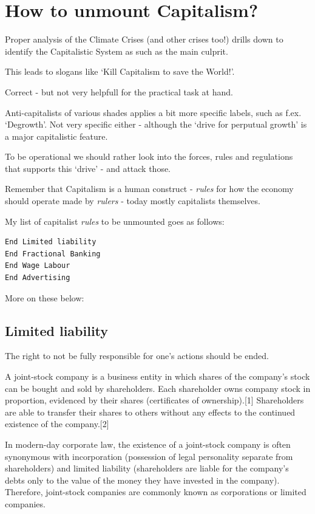 \documentclass[
]{book}
\begin{document}
\hypertarget{how-to-unmount-capitalism}{%
\chapter{How to unmount Capitalism?}\label{how-to-unmount-capitalism}}

Proper analysis of the Climate Crises (and other crises too!)
drills down to identify the Capitalistic System as such as the main culprit.

This leads to slogans like `Kill Capitalism to save the World!'.

Correct - but not very helpfull for the practical task at hand.

Anti-capitalists of various shades applies a bit more specific labels,
such as f.ex. `Degrowth'.
Not very specific either - although the `drive for perputual growth'
is a major capitalistic feature.

To be operational we should rather look into the forces, rules and regulations
that supports this `drive' - and attack those.

Remember that Capitalism is a human construct - \emph{rules} for how the economy
should operate made by \emph{rulers} - today mostly capitalists themselves.

My list of capitalist \emph{rules} to be unmounted goes as follows:

\begin{verbatim}
End Limited liability
End Fractional Banking
End Wage Labour
End Advertising
\end{verbatim}

More on these below:

\hypertarget{limited-liability}{%
\section{Limited liability}\label{limited-liability}}

The right to not be fully responsible for one's actions should be ended.

A joint-stock company is a business entity in which shares of the company's stock can be bought and sold by shareholders. Each shareholder owns company stock in proportion, evidenced by their shares (certificates of ownership).{[}1{]} Shareholders are able to transfer their shares to others without any effects to the continued existence of the company.{[}2{]}

In modern-day corporate law, the existence of a joint-stock company is often synonymous with incorporation (possession of legal personality separate from shareholders) and limited liability (shareholders are liable for the company's debts only to the value of the money they have invested in the company). Therefore, joint-stock companies are commonly known as corporations or limited companies.
\end{document}

